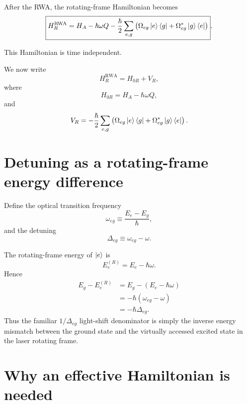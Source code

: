 \documentclass[11pt]{article}
\newcommand{\Hatom}{H_A}
\newcommand{\VR}{V_R}
\newcommand{\HR}{H_R}
\newcommand{\projE}{Q}
\begin{document}
After the RWA, the rotating-frame Hamiltonian becomes
\begin{equation}
\boxed{
\HR^{\mathrm{RWA}}
=
\Hatom
-
\hbar\omega\projE
-
\frac{\hbar}{2}
\sum_{e,g}
\left(
\Omega_{eg}\ket{e}\bra{g}
+
\Omega_{eg}^{*}\ket{g}\bra{e}
\right)
}.
\label{eq:HRRWA}
\end{equation}

This Hamiltonian is time independent.

We now write
\begin{equation}
\HR^{\mathrm{RWA}}
=
H_{0R}+\VR,
\label{eq:Hsplit}
\end{equation}
where
\begin{equation}
H_{0R}
=
\Hatom-\hbar\omega\projE,
\label{eq:H0R}
\end{equation}
and
\begin{equation}
\VR
=
-
\frac{\hbar}{2}
\sum_{e,g}
\left(
\Omega_{eg}\ket{e}\bra{g}
+
\Omega_{eg}^{*}\ket{g}\bra{e}
\right).
\label{eq:VR}
\end{equation}

\section{Detuning as a rotating-frame energy difference}

Define the optical transition frequency
\begin{equation}
\omega_{eg}
\equiv
\frac{E_e-E_g}{\hbar},
\label{eq:omegaeg}
\end{equation}
and the detuning
\begin{equation}
\boxed{
\Delta_{eg}
\equiv
\omega_{eg}-\omega
}.
\label{eq:detuning}
\end{equation}

The rotating-frame energy of $\ket{e}$ is
\begin{equation}
E_e^{(R)}=E_e-\hbar\omega.
\label{eq:Eerot}
\end{equation}
Hence
\begin{align}
E_g-E_e^{(R)}
&=
E_g-(E_e-\hbar\omega)
\nonumber\\
&=
-\hbar(\omega_{eg}-\omega)
\nonumber\\
&=
-\hbar\Delta_{eg}.
\label{eq:denominator}
\end{align}
Thus the familiar $1/\Delta_{eg}$ light-shift denominator is simply the inverse energy mismatch between the ground state and the virtually accessed excited state in the laser rotating frame.

\section{Why an effective Hamiltonian is needed}
\end{document}
